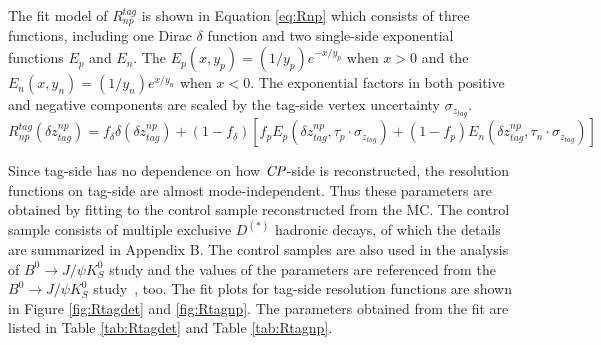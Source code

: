 The fit model of $R_{np}^{tag}$ is shown in Equation \ref{eq:Rnp} which consists of three functions, including one Dirac $\delta$ function and two single-side exponential functions $E_p$ and $E_n$. The $E_p(x, y_p)=(1/y_p)e^{-x/y_p} $ when $x > 0$ and the $E_n(x, y_n)=(1/y_n)e^{x/y_n} $ when $x < 0$.
The exponential factors in both positive and negative components are scaled by the tag-side vertex uncertainty $\sigma_{z_{tag}}$. 
\begin{equation}\label{eq:Rnp}
R_{np}^{tag}(\delta z_{tag}^{np})=f_{\delta}\delta(\delta z_{tag}^{np}) + 
(1-f_{\delta})[f_p E_p(\delta z_{tag}^{np},\tau_p\cdot \sigma_{z_{tag}}) +
(1-f_p)E_n(\delta z_{tag}^{np},\tau_n\cdot \sigma_{z_{tag}}) ]
\end{equation} 


Since tag-side has no dependence on how $\it{CP}$-side is reconstructed, the resolution functions on tag-side are almost mode-independent. Thus these parameters are obtained by fitting to the control sample reconstructed from the MC. The control sample consists of multiple exclusive $D^{(*)}$ hadronic decays, of which the details are summarized in Appendix B. The control samples are also used in the analysis of $B^0\to J/\psi K^0_S$ study and the values of the parameters are referenced from the $B^0\to J/\psi K^0_S$ study~\cite{jpsiks_ichep}, too. The fit plots for tag-side resolution functions are shown in Figure \ref{fig:Rtagdet} and \ref{fig:Rtagnp}. The parameters obtained from the fit are listed in Table \ref{tab:Rtagdet} and Table \ref{tab:Rtagnp}.


